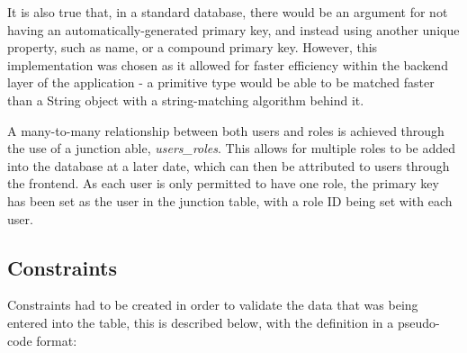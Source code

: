 It is also true that, in a standard database, there would be an argument for not having an automatically-generated primary key, and instead using another unique property, such as name, or a compound primary key. However, this implementation was chosen as it allowed for faster efficiency within the backend layer of the application - a primitive type would be able to be matched faster than a String object with a string-matching algorithm behind it.

A many-to-many relationship between both users and roles is achieved through the use of a junction able, \textit{users\_roles}. This allows for multiple roles to be added into the database at a later date, which can then be attributed to users through the frontend. As each user is only permitted to have one role, the primary key has been set as the user in the junction table, with a role ID being set with each user.

\subsection{Constraints}

Constraints had to be created in order to validate the data that was being entered into the table, this is described below, with the definition in a pseudo-code format:

\begin{table}[h]
\centering
{}
\caption{A list of constraints in the points\_of\_interest relation}
\label{poi_constraints}
\end{table}

